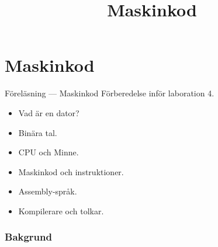 
\title{Maskinkod}
\section{Maskinkod}


\begin{frame}
    \begin{block}{\centering\Large Föreläsning  --- Maskinkod}
        Förberedelse inför laboration 4.

        \begin{itemize}
            \item Vad är en dator?
            \item Binära tal.
            \item CPU och Minne.
            \item Maskinkod och instruktioner.
            \item Assembly-språk.
            \item Kompilerare och tolkar.
        \end{itemize}
    \end{block}
\end{frame}

\begin{frame}[fragile=singleslide]
    \frametitle{Bakgrund}

    

\end{frame}











